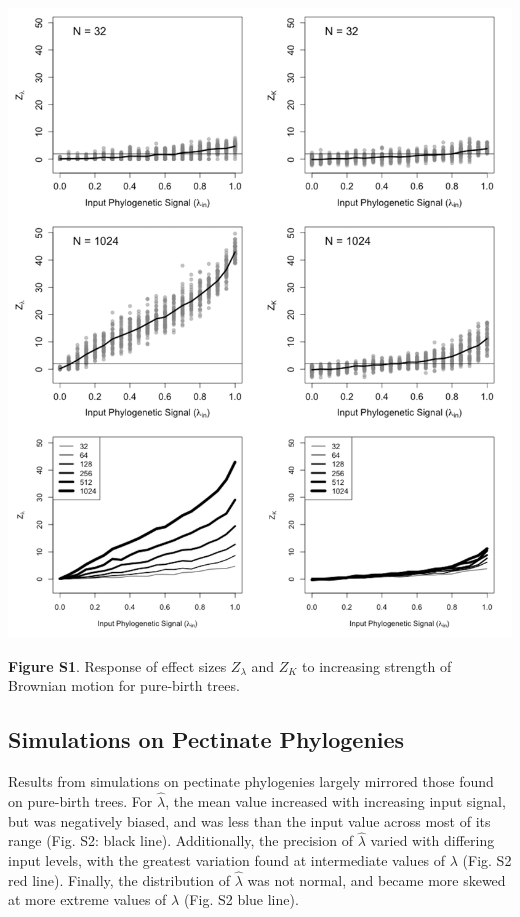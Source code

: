 \documentclass[
]{article}
\begin{document}
\includegraphics[width=0.95\linewidth]{fig.S1}

\textbf{Figure S1}. Response of effect sizes \(Z_{\lambda}\) and \(Z_K\)
to increasing strength of Brownian motion for pure-birth trees.

\newpage

\hypertarget{simulations-on-pectinate-phylogenies}{%
\subsection{Simulations on Pectinate
Phylogenies}\label{simulations-on-pectinate-phylogenies}}

Results from simulations on pectinate phylogenies largely mirrored those
found on pure-birth trees. For \(\hat{\lambda}\), the mean value
increased with increasing input signal, but was negatively biased, and
was less than the input value across most of its range (Fig. S2: black
line). Additionally, the precision of \(\hat{\lambda}\) varied with
differing input levels, with the greatest variation found at
intermediate values of \(\lambda\) (Fig. S2 red line). Finally, the
distribution of \(\hat{\lambda}\) was not normal, and became more skewed
at more extreme values of \(\lambda\) (Fig. S2 blue line). \hfill\break
\end{document}
